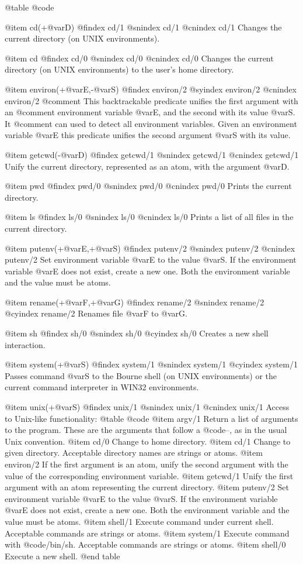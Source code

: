 {{{{{@table @code

@item cd(+@var{D})
@findex cd/1
@snindex cd/1
@cnindex cd/1
Changes the current directory (on UNIX environments).

@item cd
@findex cd/0
@snindex cd/0
@cnindex cd/0
Changes the current directory (on UNIX environments) to the user's home directory.

@item environ(+@var{E},-@var{S})
@findex environ/2
@syindex environ/2
@cnindex environ/2
@comment This backtrackable predicate unifies the first argument with an
@comment environment variable @var{E}, and the second with its value @var{S}. It
@comment can used to detect all environment variables.
    Given an environment variable @var{E} this predicate unifies the second argument @var{S} with its value.

@item getcwd(-@var{D})
@findex getcwd/1
@snindex getcwd/1
@cnindex getcwd/1
Unify the current directory, represented as an atom, with the argument
@var{D}.

@item pwd
@findex pwd/0
@snindex pwd/0
@cnindex pwd/0
Prints the current directory.

@item ls
@findex ls/0
@snindex ls/0
@cnindex ls/0
Prints a list of all files in the current directory.

@item putenv(+@var{E},+@var{S})
@findex putenv/2
@snindex putenv/2
@cnindex putenv/2
Set environment variable @var{E} to the value @var{S}. If the
environment variable @var{E} does not exist, create a new one. Both the
environment variable and the value must be atoms.

@item rename(+@var{F},+@var{G})
@findex rename/2
@snindex rename/2
@cyindex rename/2
Renames file @var{F} to @var{G}.

@item sh
@findex sh/0
@snindex sh/0
@cyindex sh/0
Creates a new shell interaction.

@item system(+@var{S})
@findex system/1
@snindex system/1
@cyindex system/1
Passes command @var{S} to the Bourne shell (on UNIX environments) or the
current command interpreter in WIN32 environments.

@item unix(+@var{S})
@findex unix/1
@snindex unix/1
@cnindex unix/1
Access to Unix-like functionality:
@table @code
@item argv/1
Return a list of arguments to the program. These are the arguments that
follow a @code{--}, as in the usual Unix convention.
@item cd/0
Change to home directory.
@item cd/1
Change to given directory. Acceptable directory names are strings or
atoms.
@item environ/2
If the first argument is an atom, unify the second argument with the
value of the corresponding environment variable.
@item getcwd/1
Unify the first argument with an atom representing the current directory.
@item putenv/2
Set environment variable @var{E} to the value @var{S}. If the
environment variable @var{E} does not exist, create a new one. Both the
environment variable and the value must be atoms.
@item shell/1
Execute command under current shell. Acceptable commands are strings or
atoms.
@item system/1
Execute command with @code{/bin/sh}. Acceptable commands are strings or
atoms.
@item shell/0
Execute a new shell.
@end table

}}}}}
